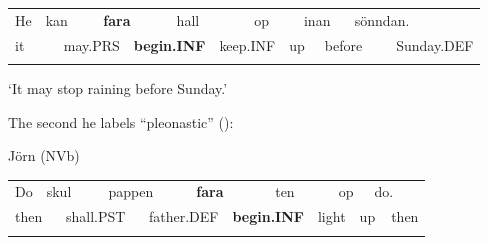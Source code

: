 \begin{tabular}{llllllllllllll}
\lsptoprule
He & \multicolumn{2}{l}{kan

} & \multicolumn{2}{l}{{\bfseries fara}

} & \multicolumn{2}{l}{hall

} & \multicolumn{2}{l}{op

} & \multicolumn{2}{l}{inan

} & \multicolumn{2}{l}{sönndan.

} & \\
\multicolumn{2}{l}{it

} & \multicolumn{2}{l}{may.PRS

} & \multicolumn{2}{l}{{\bfseries begin.INF}

} & \multicolumn{2}{l}{keep.INF

} & \multicolumn{2}{l}{up

} & \multicolumn{2}{l}{before

} & \multicolumn{2}{l}{Sunday.DEF

}\\
\lspbottomrule
\end{tabular}

\begin{styleTranslation}
 ‘It may stop raining before Sunday.’

\end{styleTranslation}

The second he labels “pleonastic” (\citet[21]{Holm1941}):

\begin{listWWNumileveli}
\item 

\begin{styleExample}
Jörn (NVb)

\end{styleExample}

\end{listWWNumileveli}

\begin{tabular}{llllllllllllll}
\lsptoprule
Do & \multicolumn{2}{l}{skul

} & \multicolumn{2}{l}{pappen

} & \multicolumn{2}{l}{{\bfseries fara}

} & \multicolumn{2}{l}{ten

} & \multicolumn{2}{l}{op

} & \multicolumn{2}{l}{do.

} & \\
\multicolumn{2}{l}{then

} & \multicolumn{2}{l}{shall.PST

} & \multicolumn{2}{l}{father.DEF

} & \multicolumn{2}{l}{{\bfseries begin.INF}

} & \multicolumn{2}{l}{light

} & \multicolumn{2}{l}{up

} & \multicolumn{2}{l}{then

}\\
\lspbottomrule
\end{tabular}

